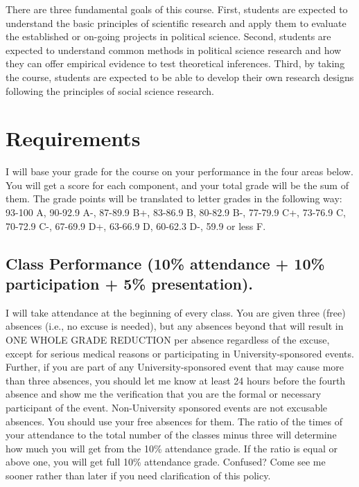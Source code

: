 \documentclass[11pt,]{article}
\theoremstyle{definition}
\theoremstyle{definition}
\theoremstyle{definition}
\theoremstyle{remark}
\begin{document}
There are three fundamental goals of this course. First, students are
expected to understand the basic principles of scientific research and
apply them to evaluate the established or on-going projects in political
science. Second, students are expected to understand common methods in
political science research and how they can offer empirical evidence to
test theoretical inferences. Third, by taking the course, students are
expected to be able to develop their own research designs following the
principles of social science research.

\section{Requirements}\label{requirements}

I will base your grade for the course on your performance in the four
areas below. You will get a score for each component, and your total
grade will be the sum of them. The grade points will be translated to
letter grades in the following way: 93-100 A, 90-92.9 A-, 87-89.9 B+,
83-86.9 B, 80-82.9 B-, 77-79.9 C+, 73-76.9 C, 70-72.9 C-, 67-69.9 D+,
63-66.9 D, 60-62.3 D-, 59.9 or less F.

\subsection{Class Performance (10\% attendance + 10\% participation +
5\%
presentation).}\label{class-performance-10-attendance-10-participation-5-presentation.}

I will take attendance at the beginning of every class. You are given
three (free) absences (i.e., no excuse is needed), but any absences
beyond that will result in ONE WHOLE GRADE REDUCTION per absence
regardless of the excuse, except for serious medical reasons or
participating in University-sponsored events. Further, if you are part
of any University-sponsored event that may cause more than three
absences, you should let me know at least 24 hours before the fourth
absence and show me the verification that you are the formal or
necessary participant of the event. Non-University sponsored events are
not excusable absences. You should use your free absences for them. The
ratio of the times of your attendance to the total number of the classes
minus three will determine how much you will get from the 10\%
attendance grade. If the ratio is equal or above one, you will get full
10\% attendance grade. Confused? Come see me sooner rather than later if
you need clarification of this policy.
\end{document}

